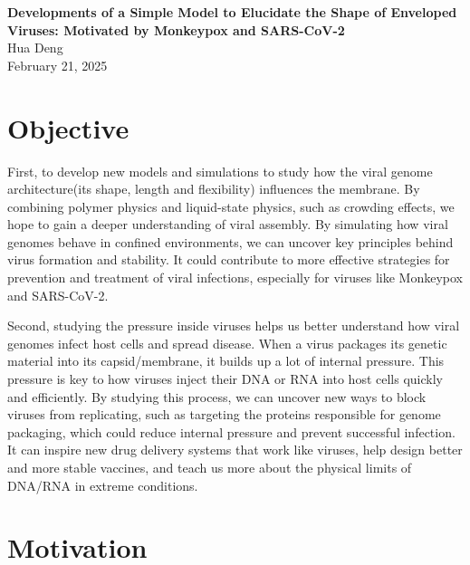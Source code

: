\documentclass[12pt]{article}
\begin{document}
\doublespacing


\begin{center}
{\Large \textbf{Developments of a Simple Model to Elucidate the Shape of Enveloped Viruses: Motivated by Monkeypox and SARS-CoV-2}}\\[1.5ex]
{\normalsize  Hua Deng}\\

{\normalsize February 21, 2025}
\end{center}





\begin{flushleft}
\setlength{\parindent}{30pt}
\section*{Objective}
First, to develop new models and simulations to study how the viral genome architecture(its shape, length and flexibility) influences the membrane. By combining polymer physics and liquid-state physics, such as crowding effects, we hope to gain a deeper understanding of viral assembly. By simulating how viral genomes behave in confined environments, we can uncover key principles behind virus formation and stability. It could contribute to more effective strategies for prevention and treatment of viral infections, especially for viruses like Monkeypox and SARS-CoV-2.


Second, studying the pressure inside viruses helps us better understand how viral genomes infect host cells and spread disease. When a virus packages its genetic material into its capsid/membrane, it builds up a lot of internal pressure. This pressure is key to how viruses inject their DNA or RNA into host cells quickly and efficiently. By studying this process, we can uncover new ways to block viruses from replicating, such as targeting the proteins responsible for genome packaging, which could reduce internal pressure and prevent successful infection. It can inspire new drug delivery systems that work like viruses, help design better and more stable vaccines, and teach us more about the physical limits of DNA/RNA in extreme conditions.

\vspace{-1em} 
\section*{Motivation}


\end{flushleft}
\end{document}
